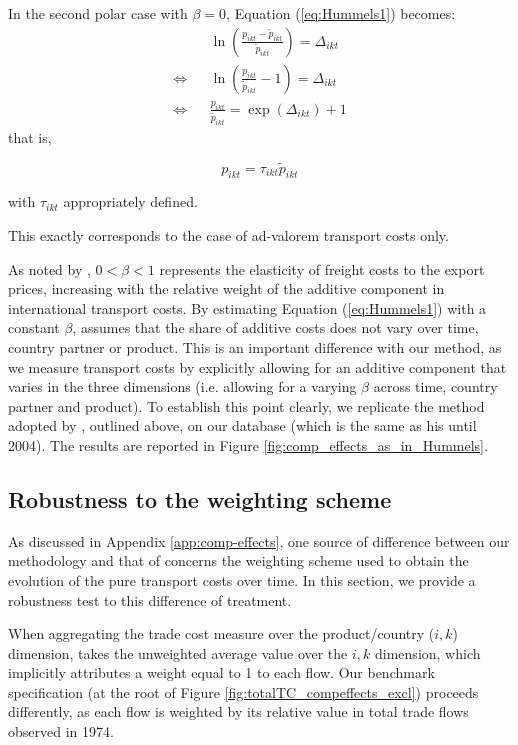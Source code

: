 \documentclass[a4paper,11pt]{article}
\begin{document}
In the second polar case with $\beta = 0$, Equation (\ref{eq:Hummels1}) becomes:
\begin{eqnarray*}
&&\ln \left(\frac{p_{ikt}- \widetilde{p}_{ikt}}{\widetilde{p}_{ikt}} \right) = \Delta_{ikt} \\
\Leftrightarrow && \ln \left(\frac{p_{ikt}}{\widetilde{p}_{ikt}}-1\right) = \Delta_{ikt}\\
\Leftrightarrow && \frac{p_{ikt}}{\widetilde{p}_{ikt}}  = \exp (\Delta_{ikt})+1
\end{eqnarray*}
\noindent that is,

$$p_{ikt} = \tau_{ikt} \widetilde{p}_{ikt}$$

\noindent with $\tau_{ikt}$ appropriately defined.

This exactly corresponds to the case of ad-valorem transport costs only.


As noted by \cite{hummels_skiba}, $0<\beta<1$ represents the elasticity of freight costs to the export prices, increasing with the relative weight of the additive component in international transport costs.
By estimating Equation (\ref{eq:Hummels1}) with a constant $\beta$, \cite{hummels2007} assumes that the share of additive costs does not vary over time, country partner or product.
This is an important difference with our method, as we measure transport costs by explicitly allowing for an additive component that varies in the three dimensions (i.e. allowing for a varying $\beta$ across time, country partner and product).
To establish this point clearly, we replicate the method adopted by \cite{hummels2007}, outlined above, on our database (which is the same as his until 2004).
The results are reported in Figure \ref{fig:comp_effects_as_in_Hummels}.


\subsection{Robustness to the weighting scheme }

As discussed in Appendix \ref{app:comp-effects}, one source of difference between our methodology and that of \cite{hummels2007} concerns the weighting scheme used to obtain the evolution of the pure transport costs over time.
In this section, we provide a robustness test to this difference of treatment.\smallskip

When aggregating the trade cost measure over the product/country ($i,k$) dimension, \cite{hummels2007} takes the unweighted average value over the $i,k$ dimension, which implicitly attributes a weight equal to 1 to each flow.
Our benchmark specification  (at the root of Figure \ref{fig:totalTC_compeffects_excl}) proceeds differently, as each flow is weighted by its relative value in total trade flows observed in 1974.
\end{document}

